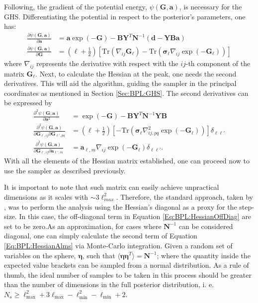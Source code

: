 \qquad Following, the gradient of the potential energy, $\psi(\mathbf{G},\mathbf{a})$, is necessary for the GHS. Differentiating the potential in respect to the posterior's parameters, one has:
\begin{align}
    \frac{\partial\psi(\mathbf{G},\mathbf{a})}{\partial\mathbf{a}} & = \mathbf{a}\exp(-\mathbf{G}) - \mathbf{B}\mathbf{Y}^T\mathbf{N}^{-1}(\mathbf{d}-\mathbf{Y}\mathbf{B}\mathbf{a}) \\
    \frac{\partial\psi(\mathbf{G},\mathbf{a})}{\partial\mathbf{G}} & = \left( {\ell}+\frac{1}{2}\right)\left[\mathrm{Tr}(\nabla_{ij}\mathbf{G}_{\ell}) -\mathrm{Tr}(\boldsymbol{\sigma}_{\ell}\nabla_{ij}\exp(-\mathbf{G}_{\ell})) \right]
\end{align}
where $\nabla_{ij}$ represents the derivative with respect with the $ij$-th component of the matrix $\mathbf{G}_{\ell}$. Next, to calculate the Hessian at the peak, one needs the second derivatives. This will aid the algorithm, guiding the sampler in the principal coordinates as mentioned in Section \ref{Sec:BPL:GHS}. The second derivatives can be expressed by
\begin{align}
    \frac{\partial^2\psi(\mathbf{G},\mathbf{a})}{\partial\mathbf{a}^2} & = \exp(-\mathbf{G}) - \mathbf{B}\mathbf{Y}^T\mathbf{N}^{-1}\mathbf{Y}\mathbf{B} \\\label{Eq:BPL:HessianAlms}
    \frac{\partial^2\psi(\mathbf{G},\mathbf{a})}{\partial\mathbf{G}_{\ell,ij}\partial\mathbf{G}_{\ell',pq}} & = \left( {\ell}+\frac{1}{2}\right)\left[-\mathrm{Tr}(\boldsymbol{\sigma}_{\ell}\nabla^2_{ij,pq} \exp(-\mathbf{G}_{\ell})) \right]\delta_{\ell\ell'} \\
    \frac{\partial^2\psi(\mathbf{G},\mathbf{a})}{\partial\mathbf{G}_{\ell,ij}\partial\mathbf{a}_{\ell',m}} & = \mathbf{a}_{\ell,m}\nabla_{ij}\exp(-\mathbf{G}_{\ell})\delta_{\ell\ell'}.\label{Eq:BPL:HessianOffDiag}
\end{align}
With all the elements of the Hessian matrix established, one can proceed now to use the sampler as described previously. 

\qquad It is important to note that such matrix can easily achieve unpractical dimensions as it scales with $\sim 3\ell_{max}^2$. Therefore, the standard approach, taken by \cite{SreeThesis}, was to perform the analysis using the Hessian's diagonal as a proxy for the step-size. In this case, the off-diagonal term in Equation \ref{Eq:BPL:HessianOffDiag} are set to be zero.As an approximation, for cases where $\mathbf{N}^{-1}$ can be considered diagonal, one can simply calculate the second term of Equation \ref{Eq:BPL:HessianAlms} via Monte-Carlo integration. Given a random set of variables on the sphere, $\bm{\eta}$, such that $\langle \bm{\eta} \bm{\eta}^T \rangle = \mathbf{N}^{-1}$; where the quantity inside the expected value brackets can be sampled from a normal distribution. As a rule of thumb, the ideal number of samples to be taken in this process should be greater than the number of dimensions in the full posterior distribution, i. e. $N_s \geq \ell_{\text{max}}^2 + 3\ell_{\text{max}} - \ell_{\text{min}}^2 - \ell_{\text{min}} + 2$. 

